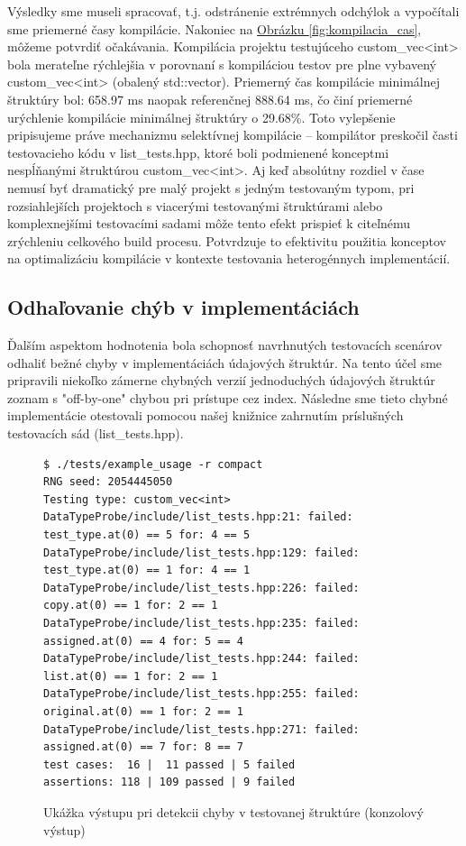 \documentclass[11pt]{article}
\begin{document}
Výsledky sme museli spracovať, t.j. odstránenie extrémnych odchýlok a vypočítali sme priemerné časy kompilácie. Nakoniec na \hyperref[fig:kompilacia_cas]{Obrázku \ref*{fig:kompilacia_cas}}, môžeme potvrdiť očakávania. Kompilácia projektu testujúceho custom\_vec<int> bola merateľne rýchlejšia v porovnaní s kompiláciou testov pre plne vybavený custom\_vec<int> (obalený std::vector). Priemerný čas kompilácie minimálnej štruktúry bol: 658.97 ms naopak referenčnej 888.64 ms, čo činí priemerné urýchlenie kompilácie minimálnej štruktúry o 29.68\%. Toto vylepšenie pripisujeme práve mechanizmu selektívnej kompilácie -- kompilátor preskočil časti testovacieho kódu v list\_tests.hpp, ktoré boli podmienené konceptmi nespĺňanými štruktúrou custom\_vec<int>. Aj keď absolútny rozdiel v čase nemusí byť dramatický pre malý projekt s jedným testovaným typom, pri rozsiahlejších projektoch s viacerými testovanými štruktúrami alebo komplexnejšími testovacími sadami môže tento efekt prispieť k citeľnému zrýchleniu celkového build procesu. Potvrdzuje to efektivitu použitia konceptov na optimalizáciu kompilácie v kontexte testovania heterogénnych implementácií.

\subsection{Odhaľovanie chýb v implementáciách}

Ďalším aspektom hodnotenia bola schopnosť navrhnutých testovacích scenárov odhaliť bežné chyby v implementáciách údajových štruktúr. Na tento účel sme pripravili niekoľko zámerne chybných verzií jednoduchých údajových štruktúr zoznam s "off-by-one" chybou pri prístupe cez index. Následne sme tieto chybné implementácie otestovali pomocou našej knižnice zahrnutím príslušných testovacích sád (list\_tests.hpp).

\begin{figure}[H]
    \centering
    \lstset{style=barebones}
    \begin{lstlisting}
$ ./tests/example_usage -r compact
RNG seed: 2054445050
Testing type: custom_vec<int>
DataTypeProbe/include/list_tests.hpp:21: failed: test_type.at(0) == 5 for: 4 == 5
DataTypeProbe/include/list_tests.hpp:129: failed: test_type.at(0) == 1 for: 4 == 1
DataTypeProbe/include/list_tests.hpp:226: failed: copy.at(0) == 1 for: 2 == 1
DataTypeProbe/include/list_tests.hpp:235: failed: assigned.at(0) == 4 for: 5 == 4
DataTypeProbe/include/list_tests.hpp:244: failed: list.at(0) == 1 for: 2 == 1
DataTypeProbe/include/list_tests.hpp:255: failed: original.at(0) == 1 for: 2 == 1
DataTypeProbe/include/list_tests.hpp:271: failed: assigned.at(0) == 7 for: 8 == 7
test cases:  16 |  11 passed | 5 failed
assertions: 118 | 109 passed | 9 failed
    \end{lstlisting}
    \caption{Ukážka výstupu pri detekcii chyby v testovanej štruktúre (konzolový výstup)}
    \label{fig:catch2_vystup}
\end{figure}
\end{document}
